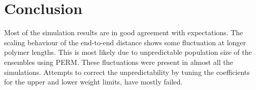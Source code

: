 \section{Conclusion}

Most of the simulation results are in good agreement with expectations. The scaling behaviour of the end-to-end distance shows some fluctuation at longer polymer lengths. This is most likely due to unpredictable population size of the ensembles using PERM. These fluctuations were present in almost all the simulations. Attempts to correct the unpredictability by tuning the coefficients for the upper and lower weight limits, have mostly failed.

